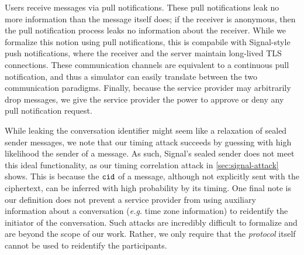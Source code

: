 Users receive messages via pull notifications.  These pull notifications leak no more information than the message itself does; if the receiver is anonymous, then the pull notification process leaks no information about the receiver.  While we formalize this notion using pull notifications, this is compabile with Signal-style push notifications, where the receiver and the server maintain long-lived TLS connections.  These communication channels are equivalent to a continuous pull notification, and thus a simulator can easily translate between the two communication paradigms.
Finally, because the service provider may arbitrarily drop messages, we give the service provider the power to approve or deny any pull notification request. 

While leaking the conversation identifier might seem like a relaxation of sealed sender messages, we note that our timing attack succeeds by guessing with high likelihood the sender of a message.  As such, Signal's sealed sender does not meet this ideal functionality, as our
timing correlation attack in \cref{sec:signal-attack} shows. This is because the $\mathtt{cid}$ of a message, although not explicitly sent with the ciphertext, can be inferred with high probability by its timing.  One final note is our definition does not prevent a service provider from using auxiliary information about a conversation ({\em e.g.} time zone information) to reidentify the initiator of the conversation.  Such attacks are incredibly difficult to formalize and are beyond the scope of our work.  Rather, we only require that the {\em protocol} itself cannot be used to reidentify the participants.



